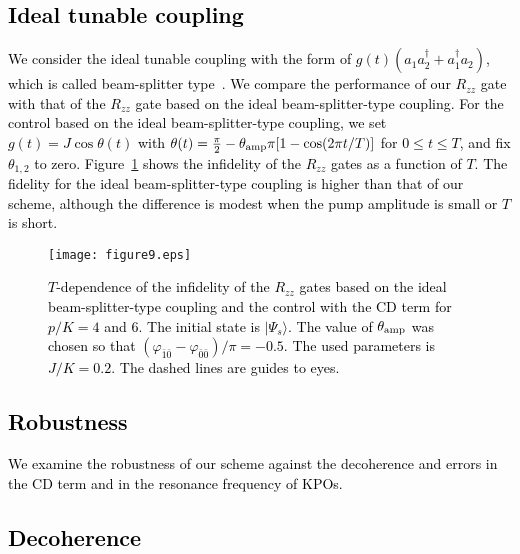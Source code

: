 \documentclass[%
 reprint,
 amsmath,amssymb,
 aps,
pra,
]{revtex4-2}
\begin{document}
\textcolor{black}{\section{Ideal tunable coupling}
\label{Beam splitter type}}
\textcolor{black}{
We consider the ideal tunable coupling with the form of $g(t)(a_1a_2^\dagger + a_1^\dagger a_2)$, which is called beam-splitter type~\cite{Gao2018}.
We compare the performance of our $R_{zz}$ gate with that of the $R_{zz}$ gate based on the ideal beam-splitter-type coupling.
For the control based on the ideal beam-splitter-type coupling, we set $g(t)=J\cos\theta(t)$ with $\theta(t) = \frac{\pi}{2} - \theta_{\rm amp} \pi [1-\cos(2\pi t/T)]$ for $0\le t \le T$, and fix $\theta_{1,2}$ to zero.
Figure~\ref{fid_BS_com_7_3_22} shows the infidelity of the $R_{zz}$ gates as a function of $T$.
The fidelity for the ideal beam-splitter-type coupling is higher than that of our scheme, although the difference is modest when the pump amplitude is small or $T$ is short.}
\begin{figure}[h!]
\begin{center}
\texttt{[image: figure9.eps]}
\end{center}
\caption{
\textcolor{black}{$T$-dependence of the infidelity of the $R_{zz}$ gates based on the ideal beam-splitter-type coupling and the control with the CD term for $p/K=4$ and 6.
The initial state is $|\Psi_s\rangle$.
The value of $\theta_{\rm amp}$ was chosen so that  $(\varphi_{\bar{1}\bar{0}} - \varphi_{\bar{0}\bar{0}})/\pi=-0.5$.
The used parameters is $J/K=0.2$.
The dashed lines are guides to eyes.}
}
\label{fid_BS_com_7_3_22}
\end{figure}


\textcolor{black}{
\section{Robustness}
\label{Robustness}}
\textcolor{black}{We examine the robustness of our scheme against the decoherence and errors in the CD term and in the resonance frequency of KPOs.}

\textcolor{black}{
\subsection{Decoherence}
\label{Decoherence}
}
\end{document}
